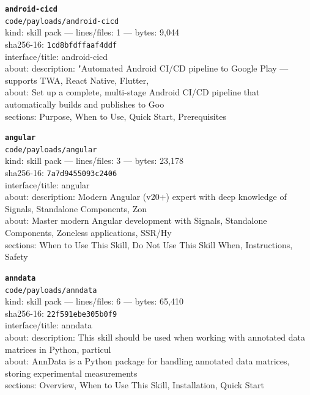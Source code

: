 \noindent\textbf{\texttt{android-cicd}}\\
\texttt{code/payloads/android-cicd}\\
kind: skill pack --- lines/files: 1 --- bytes: 9,044\\
sha256-16: \texttt{1cd8bfdffaaf4ddf}\\
interface/title: android-cicd\\
about: description: "Automated Android CI/CD pipeline to Google Play — supports TWA, React Native, Flutter,\\
about: Set up a complete, multi-stage Android CI/CD pipeline that automatically builds and publishes to Goo\\
sections: Purpose, When to Use, Quick Start, Prerequisites\\
\vspace*{6.0pt}

\noindent\textbf{\texttt{angular}}\\
\texttt{code/payloads/angular}\\
kind: skill pack --- lines/files: 3 --- bytes: 23,178\\
sha256-16: \texttt{7a7d9455093c2406}\\
interface/title: angular\\
about: description: Modern Angular (v20+) expert with deep knowledge of Signals, Standalone Components, Zon\\
about: Master modern Angular development with Signals, Standalone Components, Zoneless applications, SSR/Hy\\
sections: When to Use This Skill, Do Not Use This Skill When, Instructions, Safety\\
\vspace*{6.0pt}
\newpage

\noindent\textbf{\texttt{anndata}}\\
\texttt{code/payloads/anndata}\\
kind: skill pack --- lines/files: 6 --- bytes: 65,410\\
sha256-16: \texttt{22f591ebe305b0f9}\\
interface/title: anndata\\
about: description: This skill should be used when working with annotated data matrices in Python, particul\\
about: AnnData is a Python package for handling annotated data matrices, storing experimental measurements \\
sections: Overview, When to Use This Skill, Installation, Quick Start\\
\vspace*{6.0pt}

